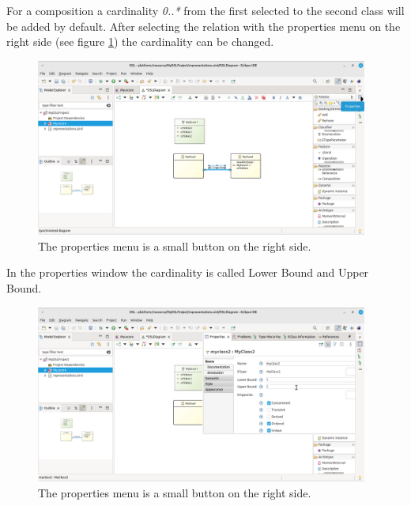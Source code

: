 \documentclass[a4paper,10pt]{article}
\newcommand{\gerquot}[1]{\glqq#1\grqq}
\newcommand{\ScreenshotWidth}{0.975}
\begin{document}
For a composition a cardinality \emph{0..*} from the first selected to the second class will be added by default. After selecting the relation with the properties menu on the right side (see figure \ref{fig:SSPropertiesButtonOnRightSide}) the cardinality can be changed.

\begin{figure}[H]
\centering
\includegraphics[width=\ScreenshotWidth\textwidth]{./Screenshots/SS_19.png}
\caption{The properties menu is a small button on the right side.}
\label{fig:SSPropertiesButtonOnRightSide}
\end{figure}

In the properties window the cardinality is called \gerquot{Lower Bound} and \gerquot{Upper Bound}.

\begin{figure}[H]
\centering
\includegraphics[width=\ScreenshotWidth\textwidth]{./Screenshots/SS_20.png}
\caption{The properties menu is a small button on the right side.}
\label{fig:SSOpenedPropertiesMenu}
\end{figure}
\end{document}
